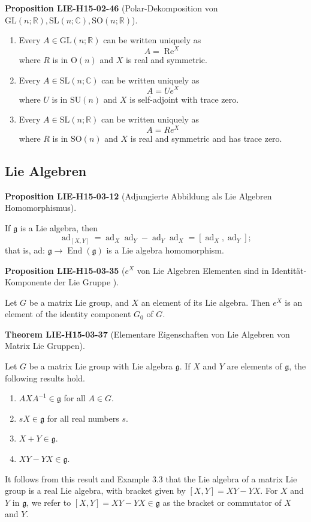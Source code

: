 \documentclass[10pt, letterpaper]{article}
\newcommand{\R}{\mathbb{R}}
\newcommand{\C}{\mathbb{C}}
\newcommand{\GL}{\mathrm{GL}}
\newcommand{\SL}{\mathrm{SL}}
\newcommand{\SO}{\mathrm{SO}}
\newcommand{\CustomHeading}[3]{%
  \par\medskip\noindent%
  \textbf{#1 #2} \textnormal{(#3)}.\enskip%
}
\newenvironment{PROP}[2]{\CustomHeading{Proposition}{#1}{#2}}{}
\newenvironment{THEO}[2]{\CustomHeading{Theorem}{#1}{#2}}{}
\begin{document}
\begin{PROP}{LIE-H15-02-46}{Polar-Dekomposition von $\GL(n;\R),\SL(n;\C),\SO(n;\R)$}
\begin{enumerate}
\item Every $A \in \mathrm{GL}(n ; \mathbb{R})$ can be written uniquely as
$$
A=\operatorname{Re}^{X}
$$
where $R$ is in $\mathrm{O}(n)$ and $X$ is real and symmetric.\\

\item Every $A \in \mathrm{SL}(n ; \mathbb{C})$ can be written uniquely as
$$
A=U e^{X}
$$
where $U$ is in $\mathrm{SU}(n)$ and $X$ is self-adjoint with trace zero.

\item Every $A \in \mathrm{SL}(n ; \mathbb{R})$ can be written uniquely as
$$
A=R e^{X}
$$
where $R$ is in $\mathrm{SO}(n)$ and $X$ is real and symmetric and has trace zero.
\end{enumerate}
\end{PROP}

\subsection{Lie Algebren}

\begin{PROP}{LIE-H15-03-12}{Adjungierte Abbildung als Lie Algebren Homomorphismus}
If $\mathfrak{g}$ is a Lie algebra, then
$$
\operatorname{ad}_{[X, Y]}=\operatorname{ad}_{X} \operatorname{ad}_{Y}-\operatorname{ad}_{Y} \operatorname{ad}_{X}=\left[\operatorname{ad}_{X}, \operatorname{ad}_{Y}\right] ;
$$
that is, ad: $\mathfrak{g} \rightarrow \operatorname{End}(\mathfrak{g})$ is a Lie algebra homomorphism.
\end{PROP}

\begin{PROP}{LIE-H15-03-35}{$e^X$ von Lie Algebren Elementen sind in Identität-Komponente der Lie Gruppe }
Let $G$ be a matrix Lie group, and $X$ an element of its Lie algebra. Then $e^{X}$ is an element of the identity component $G_{0}$ of $G$.
\end{PROP}

\begin{THEO}{LIE-H15-03-37}{Elementare Eigenschaften von Lie Algebren von Matrix Lie Gruppen}
Let $G$ be a matrix Lie group with Lie algebra $\mathfrak{g}$. If $X$ and $Y$ are elements of $\mathfrak{g}$, the following results hold.
\begin{enumerate}
  \item $A X A^{-1} \in \mathfrak{g}$ for all $A \in G$.
  \item $s X \in \mathfrak{g}$ for all real numbers $s$.
  \item $X+Y \in \mathfrak{g}$.
  \item $X Y-Y X \in \mathfrak{g}$.
\end{enumerate}
It follows from this result and Example 3.3 that the Lie algebra of a matrix Lie group is a real Lie algebra, with bracket given by $[X, Y]=X Y-Y X$. For $X$ and $Y$ in $\mathfrak{g}$, we refer to $[X, Y]=X Y-Y X \in \mathfrak{g}$ as the bracket or commutator of $X$ and $Y$.
\end{THEO}
\end{document}
